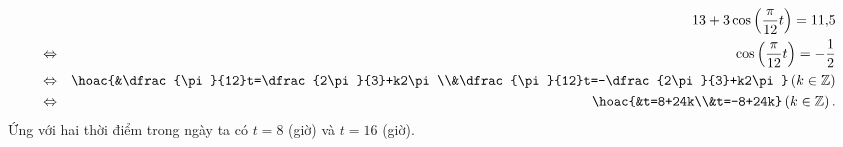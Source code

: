 \begin{ex}
{\begin{enumerate}
\begin{eqnarray*}
				&&13+3\cos \left( \dfrac{\pi }{12}t  \right) =11{,}5\\
				 &\Leftrightarrow& \cos \left( \dfrac{\pi }{12}t \right) =-\dfrac{1}{2}\\
				&\Leftrightarrow& \hoac{&\dfrac{\pi}{12}t=\dfrac{2\pi}{3}+k2\pi\\&\dfrac{\pi}{12}t=-\dfrac{2\pi}{3}+k2\pi}\left( k\in  \mathbb{Z} \right)\\
				&\Leftrightarrow& \hoac{&t=8+24k\\&t=-8+24k}\left(  k\in \mathbb{Z} \right).
			\end{eqnarray*}
			Ứng với hai thời  điểm trong ngày ta có $t=8$ (giờ) và $t=16$ (giờ).
		\end{enumerate}
	 }
\end{ex}

